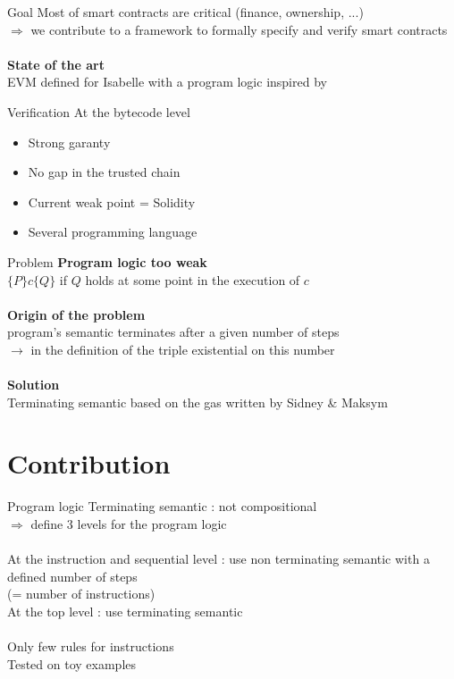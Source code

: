 \documentclass{beamer}
\begin{document}
\begin{frame}{Goal}
	Most of smart contracts are critical (finance, ownership, ...)\\
	$\Rightarrow$ we contribute to a framework to formally specify and verify smart contracts
	\\ ~ \\
	\textbf{State of the art} \\
	EVM defined for Isabelle \cite{hirai2017defining} with a program logic inspired by \cite{Myreen09}
\end{frame}

\begin{frame}{Verification}
	At the bytecode level
	\begin{itemize}
		\item Strong garanty
		\item No gap in the trusted chain
		\item Current weak point = Solidity
		\item Several programming language
	\end{itemize}
\end{frame}

\begin{frame}{Problem}
	\textbf{Program logic too weak}\\
	$\{P\}c\{Q\}$ if $Q$ holds \alert{at some point} in the execution of $c$
	\\~\\
	\textbf{Origin of the problem}\\
	program's semantic terminates after a given number of steps \\
	$\rightarrow$ in the definition of the triple existential on this number
	\\~\\
	\textbf{Solution}\\
	Terminating semantic based on the gas written by Sidney \& Maksym
\end{frame}

\part{Contribution}
\frame[plain]{\partpage}

\begin{frame}{Program logic}
	Terminating semantic : not compositional\\
	$\Rightarrow$ define 3 levels for the program logic
	\\~\\
	At the instruction and sequential level : use non terminating semantic with a \alert{defined} number of steps\\ (= number of instructions)\\
	At the top level : use terminating semantic
	\\~\\
	Only few rules for instructions\\
	Tested on toy examples
\end{frame}
\end{document}
